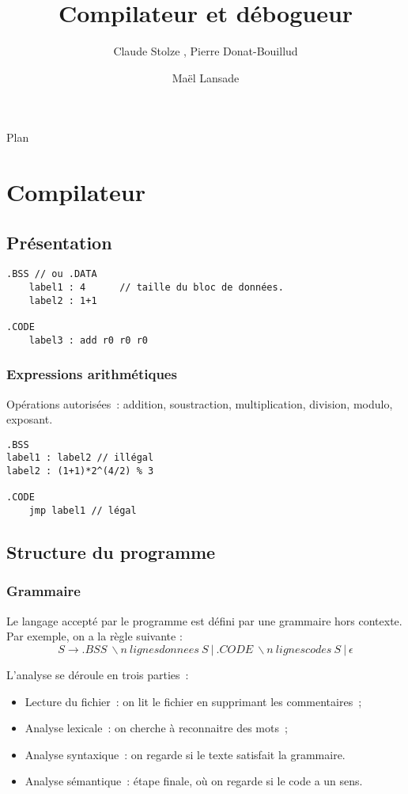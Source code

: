 \documentclass{beamer}
\title[Compilateur et débogueur] %
{Compilateur et débogueur}
\author[Claude Stolze, Pierre Donat-Bouillud, Maël Lansade]{Claude Stolze , Pierre Donat-Bouillud \and Maël Lansade}
\institute[ENS Cachan - Antenne de Bretagne]
\begin{document}
\begin{frame}
  \titlepage
\end{frame}

\begin{frame}{Plan}
  \tableofcontents
\end{frame}

\section{Compilateur}
\subsection{Présentation}
\begin{frame}[fragile]
\begin{verbatim}
.BSS // ou .DATA
	label1 : 4		// taille du bloc de données.
	label2 : 1+1

.CODE
	label3 : add r0 r0 r0
\end{verbatim}
\end{frame}

\begin{frame}[fragile]
\frametitle{Expressions arithmétiques}
Opérations autorisées~: addition, soustraction, multiplication, division, modulo, exposant.
\begin{verbatim}
.BSS
label1 : label2 // illégal
label2 : (1+1)*2^(4/2) % 3

.CODE
	jmp label1 // légal
\end{verbatim}
\end{frame}

\subsection{Structure du programme}
\begin{frame}
\frametitle{Grammaire}
Le langage accepté par le programme est défini par une grammaire hors contexte.
Par exemple, on a la règle suivante :
\[ S \rightarrow .BSS\ \backslash n\ lignesdonnees\ S\ |\ .CODE\ \backslash n\ lignescodes\ S\ |\ \epsilon \]
\end{frame}

\begin{frame}
L'analyse se déroule en trois parties~:
\begin{itemize}
\item Lecture du fichier~: on lit le fichier en supprimant les commentaires~;
\item Analyse lexicale~: on cherche à reconnaitre des mots~;
\item Analyse syntaxique~: on regarde si le texte satisfait la grammaire.
\item Analyse sémantique~: étape finale, où on regarde si le code a un sens.
\end{itemize}
\end{frame}
\end{document}
